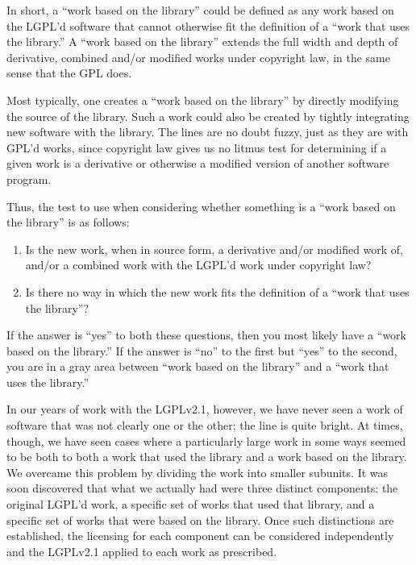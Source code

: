 In short, a ``work based on the library'' could be defined as any
work based on the LGPL'd software that cannot otherwise fit the
definition of a ``work that uses the library.''  A ``work based on the
library'' extends the full width and depth of derivative, combined and/or
modified works under copyright law, in the same sense that the GPL does.

Most typically, one creates a ``work based on the library'' by directly
modifying the source of the library. Such a work could also be created by
tightly integrating new software with the library. The lines are no doubt
fuzzy, just as they are with GPL'd works, since copyright law gives us no
litmus test for determining if a given work is a derivative or otherwise a
modified version of another software program.

Thus, the test to use when considering whether something is a ``work
based on the library'' is as follows:

\begin{enumerate}

\item Is the new work, when in source form, a derivative and/or modified
  work of, and/or a combined work with the LGPL'd work under
  copyright law?

\item Is there no way in which the new work fits the definition of a
  ``work that uses the library''?
\end{enumerate}


If the answer is ``yes'' to both these questions, then you most likely
have a ``work based on the library.''  If the answer is ``no'' to the
first but ``yes'' to the second, you are in a gray area between ``work
based on the library'' and a ``work that uses the library.''

In our years of work with the LGPLv2.1, however, we have never seen a work
of software that was not clearly one or the other; the line is quite
bright. At times, though, we have seen cases where a particularly  large work
in some ways seemed to be both to both a work that used the library and 
a work based on the library. We overcame this problem by
dividing the work into smaller subunits. It was soon discovered that
what we actually had were three distinct components: the original
LGPL'd work, a specific set of works that used that library, and a
specific set of works that were based on the library. Once such
distinctions are established, the licensing for each component can be
considered independently and the LGPLv2.1 applied to each work as
prescribed.


